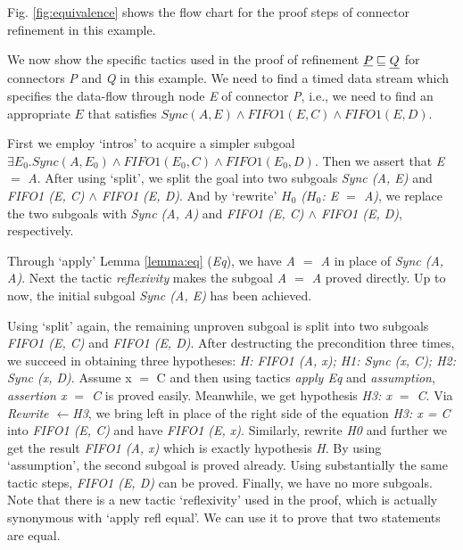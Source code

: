 \documentclass{llncs}
\begin{document}
\begin{example}[Refinement]
Fig. \ref{fig:equivalence} shows the flow chart for the proof steps of
connector refinement in this example.


We now show the specific tactics used in the proof of refinement
$\emph{P} \sqsubseteq \emph{Q}$ for connectors \emph{P} and \emph{Q}
in this example.
We need to find a timed data stream which specifies the data-flow through node \emph{E} of connector \emph{P}, i.e., we need to find an appropriate \emph{$E$} that satisfies $Sync(A,E)\wedge FIFO1(E,C) \wedge FIFO1(E,D)$.

First we employ `intros' to acquire a simpler subgoal $\exists E_{0}. Sync(A,E_{0})
\wedge FIFO1(E_{0},C) \wedge FIFO1(E_{0},D)$. Then we assert that \emph{E} $=$ \emph{A}.%
After using `split', we split the goal into two subgoals \emph{Sync (A, E)} and \emph{FIFO1 (E, C) $\wedge$ FIFO1 (E, D)}. And by `rewrite' \emph{$H_{0}$ ($H_{0}$: E $=$ A)}, we replace the two subgoals with \emph{Sync (A, A)} and \emph{FIFO1 (E, C) $\wedge$ FIFO1 (E, D)}, respectively.

Through `apply' Lemma \ref{lemma:eq} (\emph{Eq}), we have \emph{A $=$ A} in place of \emph{Sync (A, A)}. Next the tactic \emph{reflexivity} makes the subgoal \emph{A $=$ A} proved directly. Up to now, the initial subgoal \emph{Sync (A, E)} has been achieved.

Using `split' again, the remaining unproven subgoal is split into two subgoals \emph{FIFO1 (E, C)} and \emph {FIFO1 (E, D)}.
After destructing the precondition three times, we succeed in obtaining three hypotheses: \emph{ H: FIFO1 (A, x); H1: Sync (x, C); H2: Sync (x, D)}. Assume x $=$ C and then using tactics \emph{apply Eq} and \emph{assumption}, \emph{assertion x $=$ C} is proved easily. Meanwhile, we get hypothesis \emph{H3: x $=$ C}. Via \emph{Rewrite $\leftarrow$H3}, we bring left in place of the right side of the equation \emph{H3: x = C} into \emph{FIFO1 (E, C)} and have \emph{FIFO1 (E, x)}. Similarly, rewrite \emph{H0} and further we get the result \emph{FIFO1 (A, x)} which is exactly hypothesis \emph{H}. By using `assumption', the second subgoal is proved already.
Using substantially the same tactic steps, \emph{FIFO1 (E, D)} can be proved. Finally, we have no more subgoals. Note that there is a new tactic `reflexivity' used in the proof, which is actually synonymous with `apply refl equal'. We can use it to prove that two statements are equal.

\end{example}
\end{document}
